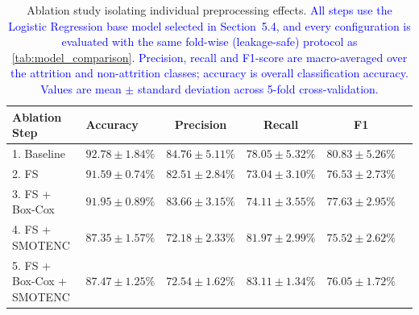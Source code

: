 \documentclass[a4paper,fleqn]{cas-sc}
\begin{document}
\begin{table}[pos=h]
\centering
    \caption{Ablation study isolating individual preprocessing effects. \textcolor{blue}{All steps use the Logistic Regression base model selected in Section~5.4, and every configuration is evaluated with the same fold-wise (leakage-safe) protocol as \cref{tab:model_comparison}.} \textcolor{blue}{Precision, recall and F1-score are macro-averaged over the attrition and non-attrition classes; accuracy is overall classification accuracy. Values are mean $\pm$ standard deviation across 5-fold cross-validation.}}
\label{tab:ablation_study}
\begin{tabular}{l l c c c c}
\hline
\textbf{Ablation Step} & \textbf{Accuracy} & \textbf{Precision} & \textbf{Recall} & \textbf{F1} \\
\hline
1. Baseline & $92.78 \pm 1.84\%$ & $84.76 \pm 5.11\%$ & $78.05 \pm 5.32\%$ & $80.83 \pm 5.26\%$ \\
2. FS & $91.59 \pm 0.74\%$ & $82.51 \pm 2.84\%$ & $73.04 \pm 3.10\%$ & $76.53 \pm 2.73\%$ \\
3. FS + Box-Cox & $91.95 \pm 0.89\%$ & $83.66 \pm 3.15\%$ & $74.11 \pm 3.55\%$ & $77.63 \pm 2.95\%$ \\
4. FS + SMOTENC & $87.35 \pm 1.57\%$ & $72.18 \pm 2.33\%$ & $81.97 \pm 2.99\%$ & $75.52 \pm 2.62\%$ \\
5. FS + Box-Cox + SMOTENC & $87.47 \pm 1.25\%$ & $72.54 \pm 1.62\%$ & $83.11 \pm 1.34\%$ & $76.05 \pm 1.72\%$ \\
\hline
\end{tabular}
\end{table}
\end{document}
